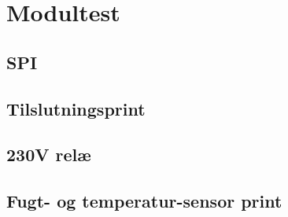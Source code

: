 \chapter{Modultest}









\section{SPI}


\section{Tilslutningsprint}


\section{230V relæ}


\section{Fugt- og temperatur-sensor print}

